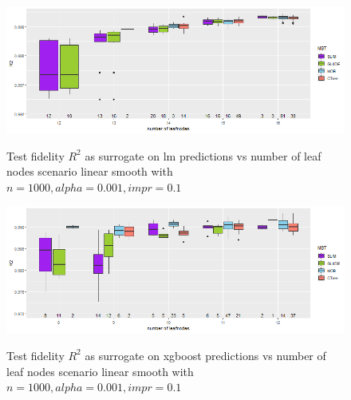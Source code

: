 \begin{figure} 
\caption{Test fidelity $R^2$ as surrogate on lm predictions vs number of leaf nodes scenario linear smooth with $n=1000, alpha = 0.001, impr = 0.1$}
    \includegraphics[width=16cm]{Figures/simulations/batchtools/basic_scenarios/linear_smooth/ls_1000_lm_r2_test.png}
    \label{fig:ls_1000_lm_r2_test}
\end{figure} 

\begin{figure} 
\caption{Test fidelity $R^2$ as surrogate on xgboost predictions vs number of leaf nodes scenario linear smooth with $n=1000, alpha = 0.001, impr = 0.1$}
    \includegraphics[width=16cm]{Figures/simulations/batchtools/basic_scenarios/linear_smooth/ls_1000_xgboost_r2_test.png}
    \label{fig:ls_1000_xgboost_r2_test}
\end{figure} 




